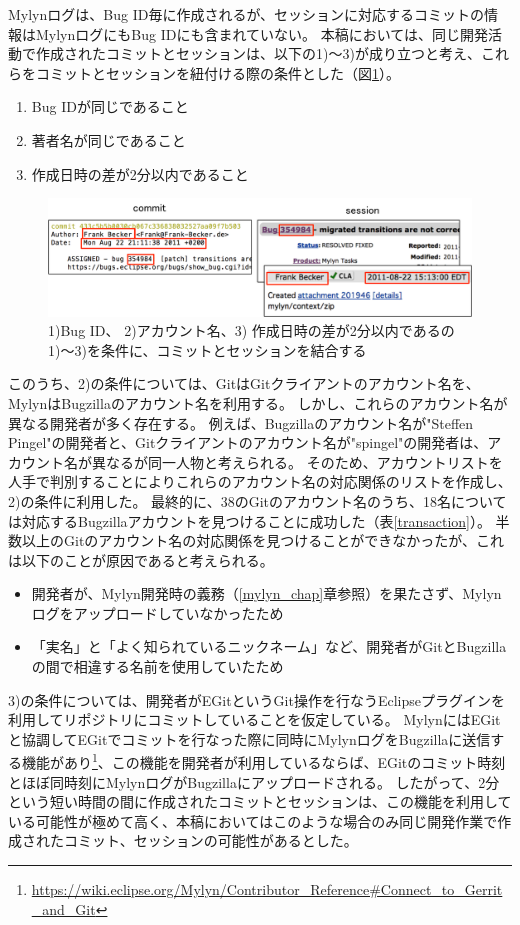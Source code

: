 \documentclass[a4paper]{jsbook}
\begin{document}
Mylynログは、Bug ID毎に作成されるが、セッションに対応するコミットの情報はMylynログにもBug IDにも含まれていない。
本稿においては、同じ開発活動で作成されたコミットとセッションは、以下の1)〜3)が成り立つと考え、これらをコミットとセッションを紐付ける際の条件とした（図\ref{concat_figure}）。
\begin{enumerate}
  \item Bug IDが同じであること
  \item 著者名が同じであること
  \item 作成日時の差が2分以内であること
\end{enumerate}
\begin{figure}[tb]
  \centering
  \includegraphics[width = \linewidth]{resource/concatenating.pdf}
  \caption{1)Bug ID、 2)アカウント名、3) 作成日時の差が2分以内であるの1)〜3)を条件に、コミットとセッションを結合する}
  \label{concat_figure}
\end{figure}
このうち、2)の条件については、GitはGitクライアントのアカウント名を、MylynはBugzillaのアカウント名を利用する。
しかし、これらのアカウント名が異なる開発者が多く存在する。
例えば、Bugzillaのアカウント名が"Steffen Pingel"の開発者と、Gitクライアントのアカウント名が"spingel"の開発者は、アカウント名が異なるが同一人物と考えられる。
そのため、アカウントリストを人手で判別することによりこれらのアカウント名の対応関係のリストを作成し、2)の条件に利用した。
最終的に、38のGitのアカウント名のうち、18名については対応するBugzillaアカウントを見つけることに成功した（表\ref{transaction}）。
半数以上のGitのアカウント名の対応関係を見つけることができなかったが、これは以下のことが原因であると考えられる。
\begin{itemize}
  \item 開発者が、Mylyn開発時の義務（\ref{mylyn_chap}章参照）を果たさず、Mylynログをアップロードしていなかったため
  \item 「実名」と「よく知られているニックネーム」など、開発者がGitとBugzillaの間で相違する名前を使用していたため
\end{itemize}

3)の条件については、開発者がEGitというGit操作を行なうEclipseプラグインを利用してリポジトリにコミットしていることを仮定している。
MylynにはEGitと協調してEGitでコミットを行なった際に同時にMylynログをBugzillaに送信する機能があり\footnote{\url{https://wiki.eclipse.org/Mylyn/Contributor_Reference\#Connect_to_Gerrit_and_Git}}、この機能を開発者が利用しているならば、EGitのコミット時刻とほぼ同時刻にMylynログがBugzillaにアップロードされる。
したがって、2分という短い時間の間に作成されたコミットとセッションは、この機能を利用している可能性が極めて高く、本稿においてはこのような場合のみ同じ開発作業で作成されたコミット、セッションの可能性があるとした。
\end{document}
